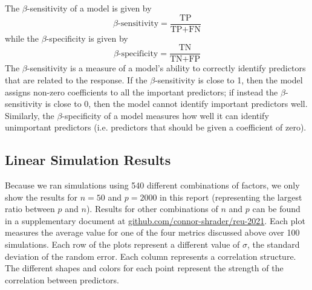 \documentclass{article}
\begin{document}

	The $\beta$-sensitivity of a model is given by
	\begin{equation}
		\beta\text{-sensitivity} = \frac{\text{TP}}{\text{TP} + \text{FN}}
	\end{equation}
	while the $\beta$-specificity is given by
	\begin{equation}
		\beta\text{-specificity} = \frac{\text{TN}}{\text{TN} + \text{FP}}
	\end{equation}
	The $\beta$-sensitivity is a measure of a model's ability to correctly identify predictors that are related to the response. If the $\beta$-sensitivity is close to 1, then the model assigns non-zero coefficients to all the important predictors; if instead the $\beta$-sensitivity is close to 0, then the model cannot identify important predictors well. Similarly, the $\beta$-specificity of a model measures how well it can identify unimportant predictors (i.e. predictors that should be given a coefficient of zero).
	
	\subsection{Linear Simulation Results}
	Because we ran simulations using 540 different combinations of factors, we only show the results for $n = 50$ and $p = 2000$ in this report (representing the largest ratio between $p$ and $n$). Results for other combinations of $n$ and $p$ can be found in a supplementary document at \href{https://github.com/connor-shrader/reu-2021}{github.com/connor-shrader/reu-2021}. Each plot measures the average value for one of the four metrics discussed above over 100 simulations. Each row of the plots represent a different value of $\sigma$, the standard deviation of the random error. Each column represents a correlation structure. The different shapes and colors for each point represent the strength of the correlation between predictors.
	
\end{document}
